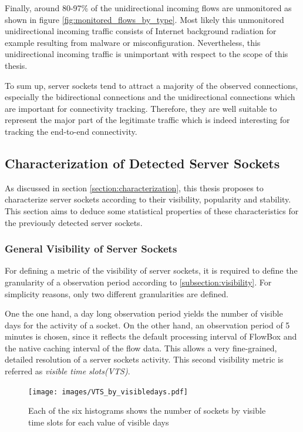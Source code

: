 Finally, around 80-97\% of the unidirectional incoming flows are unmonitored as shown in figure \ref{fig:monitored_flows_by_type}. 
Most likely this unmonitored unidirectional incoming traffic consists of Internet background radiation \citep{Wustrow10,Pang04} for example resulting from malware or misconfiguration. 
Nevertheless, this unidirectional incoming traffic is unimportant with respect to the scope of this thesis.

To sum up, \glspl{server socket} tend to attract a majority of the observed connections, especially the bidirectional connections and the unidirectional connections which are important for connectivity tracking. 
Therefore, they are well suitable to represent the major part of the legitimate traffic which is indeed interesting for tracking the end-to-end connectivity.

\newpage 
\subsection{Characterization of Detected Server Sockets}

As discussed in section \ref{section:characterization}, this thesis proposes to characterize \glspl{server socket} according to their visibility, popularity and stability. This section aims to deduce some statistical properties of these characteristics for the previously detected \glspl{server socket}.

\subsubsection{General Visibility of Server Sockets}

For defining a metric of the visibility of \glspl{server socket}, it is required to define the granularity of a observation period according to \ref{subsection:visibility}. For simplicity reasons, only two different granularities are defined.

One the one hand, a day long observation period yields the number of visible days for the activity of a socket. 
On the other hand, an observation period of 5 minutes is chosen, since it reflects the default processing interval of FlowBox and the native caching interval of the flow data. 
This allows a very fine-grained, detailed resolution of a \glspl{server socket} activity. 
This second visibility metric is referred as \emph{visible time slots(VTS)}.
\begin{figure}
	[hb] \centering 
	\texttt{[image: images/VTS\_by\_visibledays.pdf]} \caption{Each of the six histograms shows the number of sockets by visible time slots for each value of visible days} 
	\label{fig:vts_by_visibledays} 
\end{figure}

